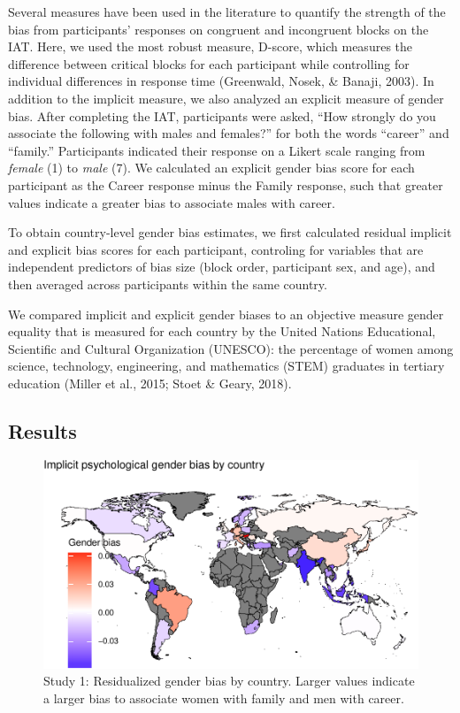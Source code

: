 \documentclass[man]{apa6}
\theoremstyle{definition}
\theoremstyle{definition}
\theoremstyle{definition}
\theoremstyle{remark}
\begin{document}
Several measures have been used in the literature to quantify the
strength of the bias from participants' responses on congruent and
incongruent blocks on the IAT. Here, we used the most robust measure,
D-score, which measures the difference between critical blocks for each
participant while controlling for individual differences in response
time (Greenwald, Nosek, \& Banaji, 2003). In addition to the implicit
measure, we also analyzed an explicit measure of gender bias. After
completing the IAT, participants were asked, \enquote{How strongly do
you associate the following with males and females?} for both the words
\enquote{career} and \enquote{family.} Participants indicated their
response on a Likert scale ranging from \emph{female} (1) to \emph{male}
(7). We calculated an explicit gender bias score for each participant as
the Career response minus the Family response, such that greater values
indicate a greater bias to associate males with career.

To obtain country-level gender bias estimates, we first calculated
residual implicit and explicit bias scores for each participant,
controling for variables that are independent predictors of bias size
(block order, participant sex, and age), and then averaged across
participants within the same country.

We compared implicit and explicit gender biases to an objective measure
gender equality that is measured for each country by the United Nations
Educational, Scientific and Cultural Organization (UNESCO): the
percentage of women among science, technology, engineering, and
mathematics (STEM) graduates in tertiary education (Miller et al., 2015;
Stoet \& Geary, 2018).

\subsection{Results}\label{results}

\begin{figure}[t]

{\centering \includegraphics{iat_lang_files/figure-latex/mapplot-1} 

}

\caption{Study 1: Residualized gender bias by country. Larger values indicate a larger bias to associate women with family and men with career.}\label{fig:mapplot}
\end{figure}
\end{document}
